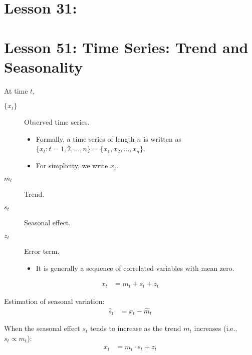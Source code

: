 \documentclass[10pt, french]{article}
\def\SectionColor{cobalt}
\begin{document}
\begin{multicols*}{2}
\section{Lesson 31: }

\pagebreak

\def\SectionColor{blue!80!white}
\section{Lesson 51: Time Series: Trend and Seasonality}
\begin{distributions}[Notation]
At time $t$,
\begin{description}
	\item[$\{x_{t}\}$]	Observed time series.
		\begin{itemize}
		\item	Formally, a time series of length $n$ is written as $\{x_{t}: t	=	1, 2, \dots, n\}	=	\{x_{1}, x_{2}, \dots, x_{n}\}$.
		\item	For simplicity, we write $x_{t}$.
		\end{itemize}
	\item[$m_{t}$]	Trend.
	\item[$s_{t}$]	Seasonal effect.
	\item[$z_{t}$]	Error term.
		\begin{itemize}
		\item	It is generally a sequence of correlated variables with mean zero.
		\end{itemize}
\end{description}
\end{distributions}

\begin{definitionNOHFILLsub}
\begin{align*}
	x_{t}
	&=	m_{t} + s_{t} + z_{t}
\end{align*}

\tcbline

Estimation of seasonal variation:
\begin{align*}
	\hat{s}_{t}
	&=	x_{t}	-	\hat{m}_{t}
\end{align*}
\end{definitionNOHFILLsub}

\begin{definitionNOHFILLsub}
When the seasonal effect $s_{t}$ tends to increase as the trend $m_{t}$ increases (i.e., $s_{t} \propto m_{t}$):
\begin{align*}
	x_{t}
	&=	m_{t} \cdot s_{t} + z_{t}
\end{align*}


\end{definitionNOHFILLsub}
\end{multicols*}
\end{document}
